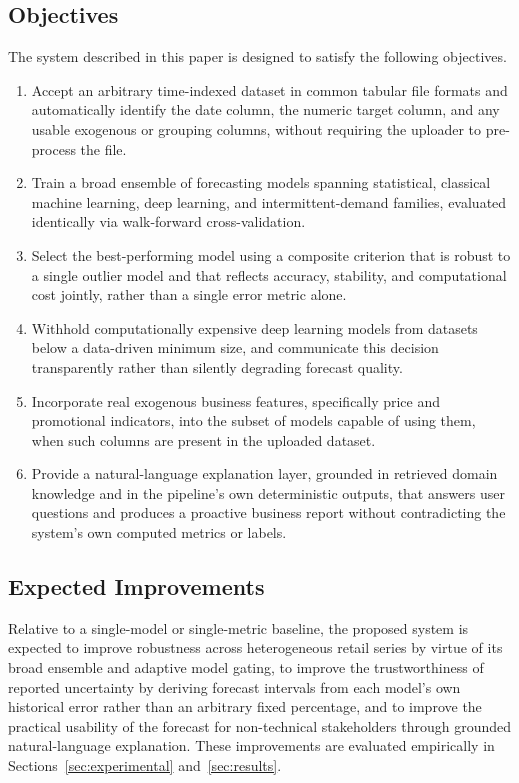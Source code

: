 \subsection{Objectives}
The system described in this paper is designed to satisfy the following objectives.
\begin{enumerate}
    \item Accept an arbitrary time-indexed dataset in common tabular file formats and automatically identify the date column, the numeric target column, and any usable exogenous or grouping columns, without requiring the uploader to pre-process the file.
    \item Train a broad ensemble of forecasting models spanning statistical, classical machine learning, deep learning, and intermittent-demand families, evaluated identically via walk-forward cross-validation.
    \item Select the best-performing model using a composite criterion that is robust to a single outlier model and that reflects accuracy, stability, and computational cost jointly, rather than a single error metric alone.
    \item Withhold computationally expensive deep learning models from datasets below a data-driven minimum size, and communicate this decision transparently rather than silently degrading forecast quality.
    \item Incorporate real exogenous business features, specifically price and promotional indicators, into the subset of models capable of using them, when such columns are present in the uploaded dataset.
    \item Provide a natural-language explanation layer, grounded in retrieved domain knowledge and in the pipeline's own deterministic outputs, that answers user questions and produces a proactive business report without contradicting the system's own computed metrics or labels.
\end{enumerate}

\subsection{Expected Improvements}
Relative to a single-model or single-metric baseline, the proposed system is expected to improve robustness across heterogeneous retail series by virtue of its broad ensemble and adaptive model gating, to improve the trustworthiness of reported uncertainty by deriving forecast intervals from each model's own historical error rather than an arbitrary fixed percentage, and to improve the practical usability of the forecast for non-technical stakeholders through grounded natural-language explanation. These improvements are evaluated empirically in Sections~\ref{sec:experimental} and~\ref{sec:results}.
